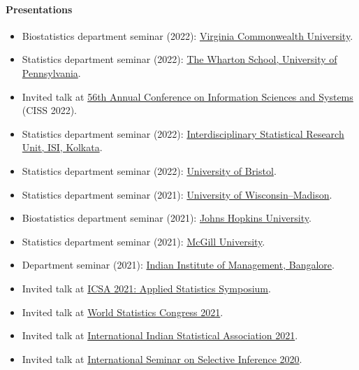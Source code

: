 \documentclass[10pt]{article}
\numberwithin{myalgctr}{section}
\begin{document}
\paragraph{Presentations}
\begin{itemize}\itemsep0em
\item Biostatistics department seminar (2022): \href{https://www.pubinfo.vcu.edu/calendar/details.asp?myVal=76554}{Virginia Commonwealth University}.
\item Statistics department seminar (2022): \href{https://statistics.wharton.upenn.edu/research/seminars-conferences/}{The Wharton School, University of Pennsylvania}.
\item Invited talk at \href{https://www.edas.info/ap/ciss2022/program.html}{56th Annual Conference on Information Sciences and Systems} (CISS 2022).
\item Statistics department seminar (2022): \href{https://www.isical.ac.in/~isru/index.html}{Interdisciplinary Statistical Research Unit, ISI, Kolkata}. 
\item Statistics department seminar (2022): \href{https://www.bristolmathsresearch.org/events/statistics/}{University of Bristol}.
\item Statistics department seminar (2021): \href{https://today.wisc.edu/events/view/164421}{University of Wisconsin–Madison}.
\item Biostatistics department seminar (2021): \href{https://publichealth.jhu.edu/departments/biostatistics/news-and-events/current-seminars}{Johns Hopkins University}. 
\item Statistics department seminar (2021): \href{https://mcgillstat.github.io/}{McGill University}.
\item Department seminar (2021): \href{https://www.iimb.ac.in/ds-webinar-series-2021-22}{Indian Institute of Management, Bangalore}.
\item Invited talk at \href{https://symposium2021.icsa.org/program/}{ICSA 2021: Applied Statistics Symposium}.
\item Invited talk at \href{https://www.isi2021.org/events/isi-world-statistics-congress-2021/index.html@session-type=ips-non-live&date=2021-07-16.html}{World Statistics Congress 2021}.
\item Invited talk at \href{https://www.intindstat.org/summerConference2021/scprogCommittee}{International Indian Statistical Association 2021}.
\item Invited talk at \href{https://www.selectiveinferenceseminar.com/}{International Seminar on Selective Inference 2020}.

\end{itemize}
\end{document}
